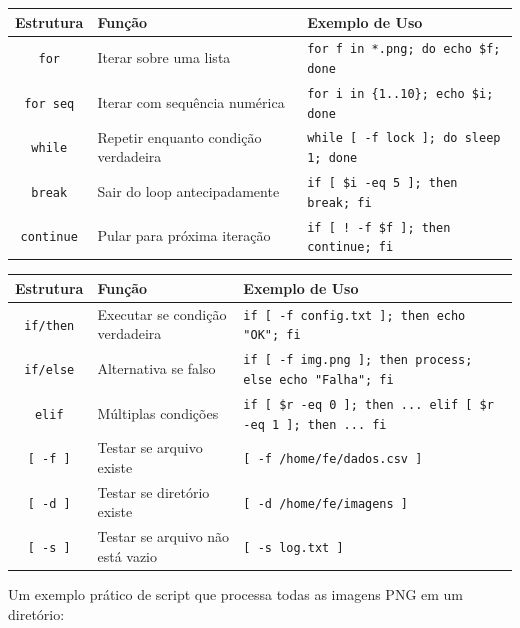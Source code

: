 \documentclass[12pt]{article}
\begin{document}
\begin{cmdbox}
\begin{tabularx}{\linewidth}{@{}C >{\raggedright\arraybackslash}X >{\raggedright\arraybackslash}X@{}}
\toprule
\textbf{Estrutura} & \textbf{Função} & \textbf{Exemplo de Uso} \\
\midrule
\texttt{for} & Iterar sobre uma lista & \texttt{for f in *.png; do echo \$f; done} \\
\texttt{for seq} & Iterar com sequência numérica & \texttt{for i in \{1..10\}; echo \$i; done} \\
\texttt{while} & Repetir enquanto condição verdadeira & \texttt{while [ -f lock ]; do sleep 1; done} \\
\texttt{break} & Sair do loop antecipadamente & \texttt{if [ \$i -eq 5 ]; then break; fi} \\
\texttt{continue} & Pular para próxima iteração & \texttt{if [ ! -f \$f ]; then continue; fi} \\
\bottomrule
\end{tabularx}
\end{cmdbox}

\begin{cmdbox}
\begin{tabularx}{\linewidth}{@{}C >{\raggedright\arraybackslash}X >{\raggedright\arraybackslash}X@{}}
\toprule
\textbf{Estrutura} & \textbf{Função} & \textbf{Exemplo de Uso} \\
\midrule
\texttt{if/then} & Executar se condição verdadeira & \texttt{if [ -f config.txt ]; then echo "OK"; fi} \\
\texttt{if/else} & Alternativa se falso & \texttt{if [ -f img.png ]; then process; else echo "Falha"; fi} \\
\texttt{elif} & Múltiplas condições & \texttt{if [ \$r -eq 0 ]; then ... elif [ \$r -eq 1 ]; then ... fi} \\
\texttt{[ -f ]} & Testar se arquivo existe & \texttt{[ -f /home/fe/dados.csv ]} \\
\texttt{[ -d ]} & Testar se diretório existe & \texttt{[ -d /home/fe/imagens ]} \\
\texttt{[ -s ]} & Testar se arquivo não está vazio & \texttt{[ -s log.txt ]} \\
\bottomrule
\end{tabularx}
\end{cmdbox}

Um exemplo prático de script que processa todas as imagens PNG em um diretório:
\end{document}
